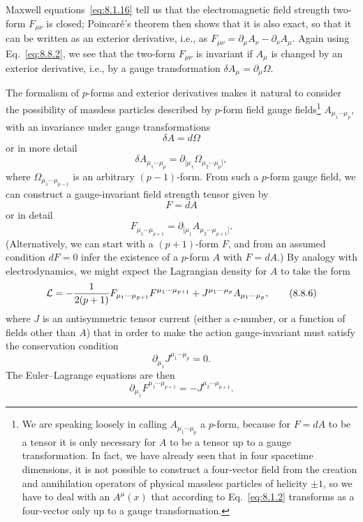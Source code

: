 Maxwell equations~\eqref{eq:8.1.16} tell us that the electromagnetic field strength
two-form $F_{\mu\nu}$ is closed; Poincaré's theorem then shows that it is also
exact, so that it can be written as an exterior derivative, i.e., as
$F_{\mu\nu}=\partial_\mu A_\nu-\partial_\nu A_\mu$. Again using Eq.~\eqref{eq:8.8.2},
we see that the two-form $F_{\mu\nu}$ is invariant if $A_\mu$ is changed by
an exterior derivative, i.e., by a gauge transformation
$\delta A_\mu=\partial_\mu\Omega$.

The formalism of $p$-forms and exterior derivatives makes it natural to
consider the possibility of massless particles described by $p$-form field
gauge fields\footnote{We are speaking loosely in calling
$A_{\mu_1\cdots\mu_p}$ a $p$-form, because for $F=dA$ to be a tensor it is
only necessary for $A$ to be a tensor up to a gauge transformation. In fact,
we have already seen that in four spacetime dimensions, it is not possible to
construct a four-vector field from the creation and annihilation operators of
physical massless particles of helicity $\pm1$, so we have to deal with an
$A^\mu(x)$ that according to Eq.~\eqref{eq:8.1.2} transforms as a four-vector only up
to a gauge transformation.} $A_{\mu_1\cdots\mu_p}$, with an invariance under
gauge transformations
\begin{equation}
\delta A=d\Omega
\tag{8.8.3}\label{eq:8.8.3}
\end{equation}
or in more detail
\[
\delta A_{\mu_1\cdots\mu_p}
=\partial_{[\mu_1}\Omega_{\mu_2\cdots\mu_p]},
\]
where $\Omega_{\mu_1\cdots\mu_{p-1}}$ is an arbitrary $(p-1)$-form. From such
a $p$-form gauge field, we can construct a gauge-invariant field strength
tensor given by
\begin{equation}
F=dA
\tag{8.8.4}\label{eq:8.8.4}
\end{equation}
or in detail
\begin{equation}
F_{\mu_1\cdots\mu_{p+1}}
=\partial_{[\mu_1}A_{\mu_2\cdots\mu_{p+1}]}.
\tag{8.8.5}\label{eq:8.8.5}
\end{equation}
(Alternatively, we can start with a $(p+1)$-form $F$, and from an assumed
condition $dF=0$ infer the existence of a $p$-form $A$ with $F=dA$.) By
analogy with electrodynamics, we might expect the Lagrangian density for $A$
to take the form
\begin{equation}
\mathcal L=-{1\over2(p+1)}F_{\mu_1\cdots\mu_{p+1}}
F^{\mu_1\cdots\mu_{p+1}}+J^{\mu_1\cdots\mu_p}A_{\mu_1\cdots\mu_p},
\tag{8.8.6}\label{eq:8.8.6}
\end{equation}
where $J$ is an antisymmetric tensor current (either a $c$-number, or a
function of fields other than $A$) that in order to make the action
gauge-invariant must satisfy the conservation condition
\begin{equation}
\partial_{\mu_1}J^{\mu_1\cdots\mu_p}=0.
\tag{8.8.7}\label{eq:8.8.7}
\end{equation}
The Euler--Lagrange equations are then
\begin{equation}
\partial_{\mu_1}F^{\mu_1\cdots\mu_{p+1}}=-J^{\mu_2\cdots\mu_{p+1}}.
\tag{8.8.8}\label{eq:8.8.8}
\end{equation}

